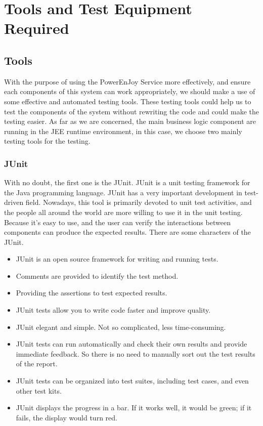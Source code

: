 \documentclass{article}
\begin{document}
\newpage

\section{Tools and Test Equipment Required}
\subsection{Tools}

With the purpose of using the PowerEnJoy Service more effectively, and ensure each components of this system can work appropriately, we should make a use of some effective and automated testing tools. These testing tools could help us to test the components of the system without rewriting the code and could make the testing easier.
\newline
As far as we are concerned, the main business logic component are running in the JEE runtime environment, in this case, we choose two mainly testing tools for the testing.

\subsubsection{JUnit}
With no doubt, the first one is the JUnit. JUnit is a unit testing framework for the Java programming language. JUnit has a very important development in test-driven field. Nowadays, this tool is primarily devoted to unit test activities, and the people all around the world are more willing to use it in the unit testing. Because it's easy to use, and the user can verify the interactions between components can produce the expected results. There are some characters of the JUnit.
\begin{itemize}
	\item JUnit is an open source framework for writing and running tests.
	\item Comments are provided to identify the test method.
	\item Providing the assertions to test expected results.
	\item JUnit tests allow you to write code faster and improve quality.
	\item JUnit elegant and simple. Not so complicated, less time-consuming.
	\item JUnit tests can run automatically and check their own results and provide immediate feedback. So there is no need to manually sort out the test results of the report.
	\item JUnit tests can be organized into test suites, including test cases, and even other test kits.
	\item JUnit displays the progress in a bar. If it works well, it would be green; if it fails, the display would turn red.
\end{itemize}
\end{document}
